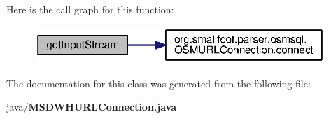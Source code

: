 Here is the call graph for this function\+:\nopagebreak
\begin{figure}[H]
\begin{center}
\leavevmode
\includegraphics[width=312pt]{classorg_1_1smallfoot_1_1parser_1_1msosmsql_1_1MSDWHURLConnection_a0924d1107a459be632532ef34324494e_cgraph}
\end{center}
\end{figure}




The documentation for this class was generated from the following file\+:\begin{DoxyCompactItemize}
\item 
java/{\bf M\+S\+D\+W\+H\+U\+R\+L\+Connection.\+java}\end{DoxyCompactItemize}
